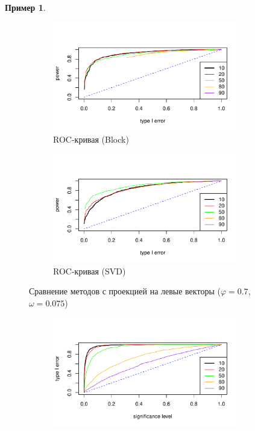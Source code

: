\documentclass[specialist,
substylefile = spbu_report.rtx,
subf,href,colorlinks=true, 12pt]{disser}
\theoremstyle{definition}
\newtheorem{example}{Пример}
\begin{document}
\begin{example}
\begin{figure}[h!]
\begin{subfigure}[t]{0.5\textwidth}
		\centering
		\includegraphics[width=0.9\textwidth]{img/roc_block_ev_omega0075.pdf}
		\caption{ROC-кривая (Block)}
		\label{fig:block_ev_r}
	\end{subfigure}\hspace{\fill}
	\begin{subfigure}[t]{0.5\textwidth}
		\centering
		\includegraphics[width=0.9\textwidth]{img/roc_mssa_ev.pdf}
		\caption{ROC-кривая (SVD)}
	\end{subfigure}
	\caption{Сравнение методов с проекцией на левые векторы ($\varphi=0.7$, $\omega=0.075$)}
	\label{fig:block_ev}
\end{figure}
\begin{figure}[h!]
	\captionsetup[subfigure]{justification=Centering}
	\begin{subfigure}[t]{0.5\textwidth}
		\centering
		\includegraphics[width=0.9\textwidth]{img/type1error_block_fa.pdf}

\end{subfigure}
\end{figure}
\end{example}
\end{document}

